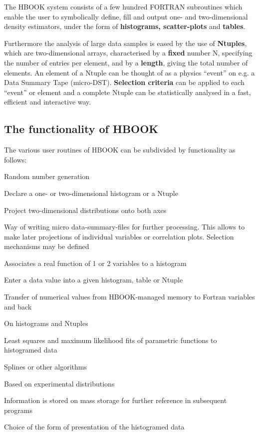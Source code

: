 The HBOOK system consists of a few hundred FORTRAN
subroutines which enable the user to symbolically define, fill and output
one- and two-dimensional density estimators, under the form
of {\bf histograms, scatter-plots} and {\bf tables}.

Furthermore the analysis of large data samples is eased by the use
of {\bf Ntuples}, which
are two-dimensional arrays, characterised by a
{\bf fixed} number N, specifying the number of entries per element,
and by a {\bf length}, giving the
total number of elements. An element of a Ntuple can be thought of
as a physics ``event'' on e.g. a Data Summary Tape (micro-DST).
{\bf Selection criteria}
can be applied to each ``event'' or element and
a complete Ntuple can be statistically analysed in a fast, efficient
and interactive way.

\subsection{The functionality of HBOOK}
      
The various user routines of HBOOK can be subdivided by functionality
as follows:
\begin{DL}{Random number generation}
\item[Booking]
      Declare a one- or two-dimensional histogram or a Ntuple
\item[Projections]
      Project two-dimensional distributions onto both axes
\item[Ntuples]
      Way of writing micro data-summary-files for further
      processing. This allows to make later projections of
      individual variables or correlation plots. Selection mechanisms
      may be defined
\item[Function representation]
      Associates a real function of 1 or 2 variables to a histogram
\item[Filling]
      Enter a data value into a given histogram, table or Ntuple
\item[Access to information]
      Transfer of numerical values from HBOOK-managed memory to Fortran
      variables and back
\item[Arithmetic operations]
      On histograms and Ntuples
\item[Fitting]
      Least squares and maximum likelihood fits of
      parametric functions to histogramed data
\item[Smoothing]
      Splines or other algorithms
\item[Random number generation]
      Based on experimental distributions
\item[Archiving]
      Information is stored
      on mass storage for further reference in subsequent programs
\item[Editing]
      Choice of the form of presentation of the histogramed data
\end{DL}

